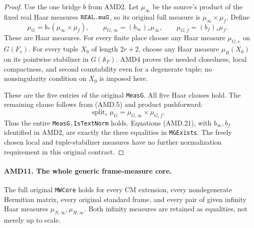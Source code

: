 \documentclass[11pt,a4paper]{article}
\numberwithin{equation}{section}
\theoremstyle{remark}\newtheorem{remark}[theorem]{Remark}
\begin{document}
\begin{proof}
Use the one bridge \(b\) from AMD2.  Let \(\mu_\infty\)
be the source's product of the fixed real Haar measures
\(\texttt{REAL.\allowbreak mu\allowbreak G}\), so its original full measure is
\(\mu_\infty\times\mu_f\).  Define
\[
 \mu_G=b_*(\mu_\infty\times\mu_f),\qquad
 \mu_{G,\infty}=(b_\infty)_*\mu_\infty,\qquad
 \mu_{G,f}=(b_f)_*\mu_f.
 \tag{AMD.21}
\]
These are Haar measures.  For every finite place choose any
Haar measure \(\mu_{G,v}\) on \(G(F_v)\).  For every tuple
\(X_0\) of length \(2r+2\), choose any Haar measure \(\mu_B(X_0)\)
on its pointwise stabilizer in \(G(\mathbb A_F)\).
AMD4 proves the needed closedness, local compactness, and second
countability even for a degenerate tuple; no nonsingularity
condition on \(X_0\) is imposed here.

These are the five entries of the original \texttt{Meas\allowbreak G}.
All five Haar clauses hold.  The remaining clause follows
from (AMD.5) and product pushforward:
\[
        \operatorname{split}_*\mu_G
            =\mu_{G,\infty}\times\mu_{G,f}.
 \tag{AMD.22}
\]
Thus the entire \texttt{Meas\allowbreak G.\allowbreak Is\allowbreak Text\allowbreak Norm} holds.  Equations
(AMD.21), with \(b_\infty,b_f\) identified in AMD2, are
exactly the three equalities in \texttt{MGExists}.  The freely
chosen local and tuple-stabilizer measures have no further
normalization requirement in this original contract.
\end{proof}

\paragraph{AMD11. The whole generic frame-measure core.}
\label{claim:AMD11}
The full original \texttt{MWCore} holds for every CM extension,
every nondegenerate Hermitian matrix, every original standard
frame, and every pair of given infinity Haar measures
\(\mu_{N,\infty},\mu_{H,\infty}\).  Both infinity measures
are retained as equalities, not merely up to scale.
\end{document}
